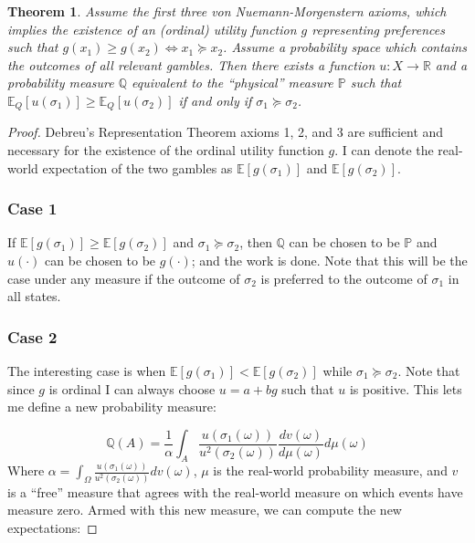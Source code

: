 \documentclass{article}
\newtheorem{theorem}{Theorem}
\begin{document}
\begin{theorem} \label{theorem1}
Assume the first three von Nuemann-Morgenstern axioms, which implies the existence of an (ordinal) utility function \(g\) representing preferences such that \(g(x_1)\geq g(x_2) \Leftrightarrow x_1 \succeq x_2 \).  Assume a probability space which contains the outcomes of all relevant gambles. Then there exists a function \(u: X \to \mathbb{R}\) and a probability measure \(\mathbb{Q}\) equivalent to the ``physical'' measure \(\mathbb{P}\) such that \(\mathbb{E}_Q\left[u(\sigma_1)\right] \geq \mathbb{E}_Q\left[u(\sigma_2)\right]\) if and only if \(\sigma_1 \succeq \sigma_2\).  
\end{theorem} 

\begin{proof}
Debreu's Representation Theorem axioms 1, 2, and 3 are sufficient and necessary for the existence of the ordinal utility function \(g\).  I can denote the real-world expectation of the two gambles as \(\mathbb{E}[g(\sigma_1)]\) and \(\mathbb{E}[g(\sigma_2)]\). 

\subsubsection*{Case 1}

If \(\mathbb{E}[g(\sigma_1)]\geq\mathbb{E}[g(\sigma_2)]\) and \(\sigma_1 \succeq \sigma_2\), then \(\mathbb{Q}\) can be chosen to be \(\mathbb{P}\) and \(u(\cdot)\) can be chosen to be \(g(\cdot)\); and the work is done. Note that this will be the case under any measure if the outcome of \(\sigma_2\) is preferred to the outcome of \(\sigma_1\) in all states.

\subsubsection*{Case 2}

The interesting case is when \(\mathbb{E}[g(\sigma_1)]<\mathbb{E}[g(\sigma_2)]\) while \(\sigma_1 \succeq \sigma_2\).  Note that since \(g\) is ordinal I can always choose \(u=a+bg\) such that \(u\) is positive.  This lets me define a new probability measure:

\[\mathbb{Q}(A)=\frac{1}{\alpha}\int_A \frac{u(\sigma_1(\omega))}{u^2(\sigma_2(\omega))} \frac{dv(\omega) }{ d\mu(\omega)} d\mu(\omega)\] 
Where \(\alpha=\int_\Omega \frac{u(\sigma_1(\omega))}{u^2(\sigma_2(\omega))} dv(\omega) \), \(\mu\) is the real-world probability measure, and \(v\) is a ``free'' measure that agrees with the real-world measure on which events have measure zero.  Armed with this new measure, we can compute the new expectations:


\end{proof}
\end{document}
